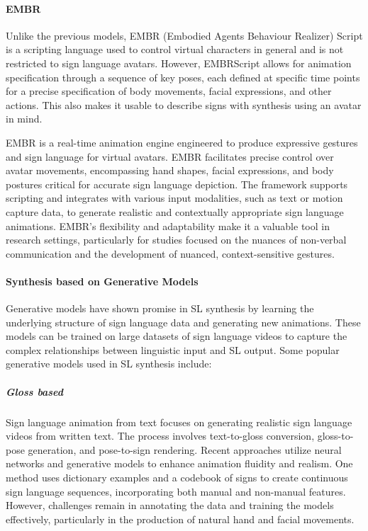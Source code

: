 \documentclass[../../main.tex]{subfiles}
\begin{document}
\paragraph{EMBR}
\label{ch:background_work:sign_language_synthesis:3d_techniques:sign_language_synthesis_systems:embr}

Unlike the previous models, EMBR (Embodied Agents Behaviour Realizer) Script is a scripting language used to control virtual characters in general and is not restricted to sign language avatars. However, EMBRScript allows for animation specification through a sequence of key poses, each defined at specific time points for a precise specification of body movements, facial expressions, and other actions. This also makes it usable to describe signs with synthesis using an avatar in mind.

EMBR is a real-time animation engine engineered to produce expressive gestures and sign language for virtual avatars. EMBR facilitates precise control over avatar movements, encompassing hand shapes, facial expressions, and body postures critical for accurate sign language depiction. The framework supports scripting and integrates with various input modalities, such as text or motion capture data, to generate realistic and contextually appropriate sign language animations. EMBR's flexibility and adaptability make it a valuable tool in research settings, particularly for studies focused on the nuances of non-verbal communication and the development of nuanced, context-sensitive gestures.

\paragraph{Synthesis based on Generative Models}
\label{ch:background_work:sign_language_synthesis:3d_techniques:sign_language_synthesis_systems:synthesis_based_on_generative_models}

Generative models have shown promise in SL synthesis by learning the underlying structure of sign language data and generating new animations. These models can be trained on large datasets of sign language videos to capture the complex relationships between linguistic input and SL output. Some popular generative models used in SL synthesis include:

\subparagraph{Gloss based}
\label{ch:background_work:sign_language_synthesis:3d_techniques:sign_language_synthesis_systems:synthesis_based_on_generative_models:gloss_based}

Sign language animation from text focuses on generating realistic sign language videos from written text. The process involves text-to-gloss conversion, gloss-to-pose generation, and pose-to-sign rendering. Recent approaches utilize neural networks and generative models to enhance animation fluidity and realism. One method uses dictionary examples and a codebook of signs to create continuous sign language sequences, incorporating both manual and non-manual features. However, challenges remain in annotating the data and training the models effectively, particularly in the production of natural hand and facial movements.
\end{document}
